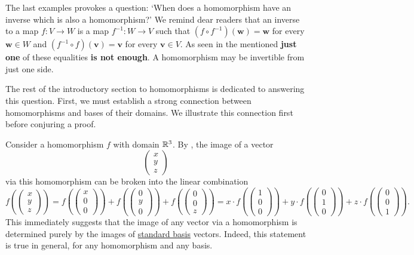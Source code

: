 The last examples provokes a question: `When does a homomorphism have an inverse
which is also a homomorphism?' We remind dear readers that an inverse to a map
$f:V \to W$ is a map $f^{-1}:W \to V$ such that $(f \circ f^{-1})(\mathbf{w}) =
\mathbf{w}$ for every $\mathbf{w} \in W$ and $(f^{-1} \circ f)(\mathbf{v}) =
\mathbf{v}$ for every $\mathbf{v} \in V$. As seen in the mentioned
 \textbf{just one} of these equalities \textbf{is
not enough}. A homomorphism may be invertible from just one side.

The rest of the introductory section to homomorphisms is dedicated to answering
this question. First, we must establish a strong connection between
homomorphisms and bases of their domains. We illustrate this connection first
before conjuring a proof.

Consider a homomorphism $f$ with domain $\mathbb{R}^3$. By
, the image of a vector
\[
 \begin{pmatrix}
  x\\
  y\\
  z
 \end{pmatrix}
\]
via this homomorphism can be broken into the linear combination
\[
 f \left( 
 \begin{pmatrix}
  x\\
  y\\
  z
 \end{pmatrix}
 \right) = f \left( 
 \begin{pmatrix}
  x\\
  0\\
  0
 \end{pmatrix}
 \right) + f \left( 
 \begin{pmatrix}
  0\\
  y\\
  0
 \end{pmatrix}
 \right) + f \left( 
 \begin{pmatrix}
  0\\
  0\\
  z
 \end{pmatrix}
 \right) = x \cdot 
 f \left( 
 \begin{pmatrix}
  1\\
  0\\
  0
 \end{pmatrix}
 \right) + y \cdot f \left(
 \begin{pmatrix}
  0\\
  1\\
  0
 \end{pmatrix}
 \right) + z \cdot f \left( 
 \begin{pmatrix}
  0\\
  0\\
  1
 \end{pmatrix}
 \right).
\]
This immediately suggests that the image of any vector via a homomorphism is
determined purely by the images of \hyperref[def:standard-basis]{standard basis}
vectors. Indeed, this statement is true in general, for any homomorphism and any
basis.

